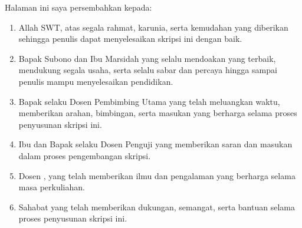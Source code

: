 


\noindent Halaman ini saya persembahkan kepada:

\begin{enumerate}[nosep]
    \item Allah SWT, atas segala rahmat, karunia, serta kemudahan yang diberikan sehingga penulis dapat menyelesaikan skripsi ini dengan baik.

    \item Bapak Subono dan Ibu Marsidah yang selalu mendoakan yang terbaik, mendukung segala usaha, serta selalu sabar dan percaya hingga sampai penulis mampu menyelesaikan pendidikan.

    \item Bapak \supervisor{} selaku Dosen Pembimbing Utama yang telah meluangkan waktu, memberikan arahan, bimbingan, serta masukan yang berharga selama proses penyusunan skripsi ini.

    \item Ibu \examinerOne{} dan Bapak \examinerTwo{} selaku Dosen Penguji yang memberikan saran dan masukan dalam proses pengembangan skripsi.

    \item Dosen \faculty{}, \university{} yang telah memberikan ilmu dan pengalaman yang berharga selama masa perkuliahan.

    \item Sahabat yang telah memberikan dukungan, semangat, serta bantuan selama proses penyusunan skripsi ini.

\end{enumerate}

\newpage
